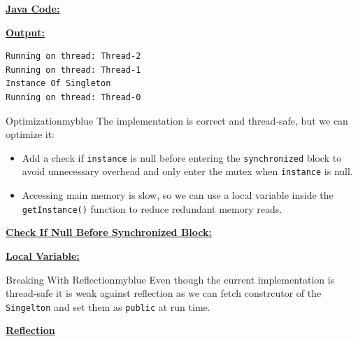 \newpage
\textbf{\underline{Java Code:}}


\vspace{0.5cm}

\textbf{\underline{Output:}}
\begin{lstlisting}[style=cmd]
Running on thread: Thread-2
Running on thread: Thread-1
Instance Of Singleton
Running on thread: Thread-0
\end{lstlisting}

\vspace{1cm}

\begin{prettyBox}{Optimization}{myblue}
The implementation is correct and thread-safe, but we can optimize it:
\begin{itemize}
    \item Add a check if \texttt{instance} is null before entering the \texttt{synchronized} block 
        to avoid unnecessary overhead and only enter the mutex when \texttt{instance} is null.
    \item Accessing main memory is slow, so we can use a local variable inside the 
        \texttt{getInstance()} function to reduce redundant memory reads.
\end{itemize}
\end{prettyBox}

\newpage
\textbf{\underline{Check If Null Before Synchronized Block:}}


\vspace{1cm}

\textbf{\underline{Local Variable:}}


\newpage
\null

\begin{prettyBox}{Breaking With Reflection}{myblue}
Even though the current implementation is thread-safe it is weak against
reflection as we can fetch constrcutor of the \texttt{Singelton} and set 
them as \texttt{public} at run time.
\end{prettyBox}

\vspace{1cm}

\textbf{\underline{Reflection}}
\vspace{0.1cm}



